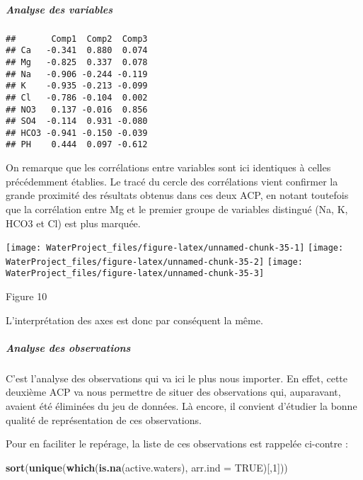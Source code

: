 \documentclass[]{article}
\newenvironment{Shaded}{\begin{snugshade}}{\end{snugshade}}
\newcommand{\KeywordTok}[1]{\textcolor[rgb]{0.13,0.29,0.53}{\textbf{#1}}}
\newcommand{\DataTypeTok}[1]{\textcolor[rgb]{0.13,0.29,0.53}{#1}}
\newcommand{\DecValTok}[1]{\textcolor[rgb]{0.00,0.00,0.81}{#1}}
\newcommand{\OtherTok}[1]{\textcolor[rgb]{0.56,0.35,0.01}{#1}}
\newcommand{\OperatorTok}[1]{\textcolor[rgb]{0.81,0.36,0.00}{\textbf{#1}}}
\newcommand{\NormalTok}[1]{#1}
\let\oldsubparagraph\subparagraph
\renewcommand{\subparagraph}[1]{\oldsubparagraph{#1}\mbox{}}
\begin{document}
\subparagraph{Analyse des variables}\label{analyse-des-variables-1}

\begin{Shaded}
\end{Shaded}

\begin{verbatim}
##       Comp1  Comp2  Comp3
## Ca   -0.341  0.880  0.074
## Mg   -0.825  0.337  0.078
## Na   -0.906 -0.244 -0.119
## K    -0.935 -0.213 -0.099
## Cl   -0.786 -0.104  0.002
## NO3   0.137 -0.016  0.856
## SO4  -0.114  0.931 -0.080
## HCO3 -0.941 -0.150 -0.039
## PH    0.444  0.097 -0.612
\end{verbatim}

On remarque que les corrélations entre variables sont ici identiques à
celles précédemment établies. Le tracé du cercle des corrélations vient
confirmer la grande proximité des résultats obtenus dans ces deux ACP,
en notant toutefois que la corrélation entre Mg et le premier groupe de
variables distingué (Na, K, HCO3 et Cl) est plus marquée.

\texttt{[image: WaterProject\_files/figure-latex/unnamed-chunk-35-1]}
\texttt{[image: WaterProject\_files/figure-latex/unnamed-chunk-35-2]}
\texttt{[image: WaterProject\_files/figure-latex/unnamed-chunk-35-3]}

Figure 10

L'interprétation des axes est donc par conséquent la même.

\subparagraph{Analyse des
observations}\label{analyse-des-observations-1}

C'est l'analyse des observations qui va ici le plus nous importer. En
effet, cette deuxième ACP va nous permettre de situer des observations
qui, auparavant, avaient été éliminées du jeu de données. Là encore, il
convient d'étudier la bonne qualité de représentation de ces
observations.

Pour en faciliter le repérage, la liste de ces observations est rappelée
ci-contre :

\begin{Shaded}
\begin{Highlighting}[]
\KeywordTok{sort}\NormalTok{(}\KeywordTok{unique}\NormalTok{(}\KeywordTok{which}\NormalTok{(}\KeywordTok{is.na}\NormalTok{(active.waters), }\DataTypeTok{arr.ind =} \OtherTok{TRUE}\NormalTok{)[,}\DecValTok{1}\NormalTok{]))}
\end{Highlighting}
\end{Shaded}
\end{document}

